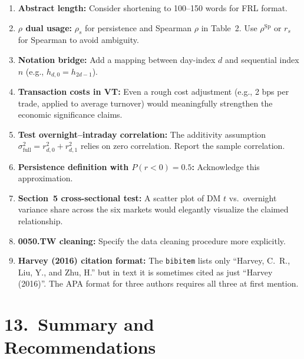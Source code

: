 \documentclass[12pt,a4paper]{article}
\begin{document}
\begin{enumerate}[label=\textbf{m\arabic*}]

\item \textbf{Abstract length:} Consider shortening to 100--150 words for FRL format.

\item \textbf{$\rho$ dual usage:} $\rho_s$ for persistence and Spearman $\rho$ in Table~2. Use $\rho^{\text{Sp}}$ or $r_s$ for Spearman to avoid ambiguity.

\item \textbf{Notation bridge:} Add a mapping between day-index $d$ and sequential index $n$ (e.g., $h_{d,0} = h_{2d-1}$).

\item \textbf{Transaction costs in VT:} Even a rough cost adjustment (e.g., 2 bps per trade, applied to average turnover) would meaningfully strengthen the economic significance claims.

\item \textbf{Test overnight--intraday correlation:} The additivity assumption $\sigma^2_{\text{full}} = r^2_{d,0} + r^2_{d,1}$ relies on zero correlation. Report the sample correlation.

\item \textbf{Persistence definition with $P(r<0) = 0.5$:} Acknowledge this approximation.

\item \textbf{Section~5 cross-sectional test:} A scatter plot of DM $t$ vs.\ overnight variance share across the six markets would elegantly visualize the claimed relationship.

\item \textbf{0050.TW cleaning:} Specify the data cleaning procedure more explicitly.

\item \textbf{Harvey (2016) citation format:} The \texttt{bibitem} lists only ``Harvey, C.~R., Liu, Y., and Zhu, H.'' but in text it is sometimes cited as just ``Harvey (2016)''. The APA format for three authors requires all three at first mention.

\end{enumerate}


\section*{13.\ Summary and Recommendations}
\end{document}
